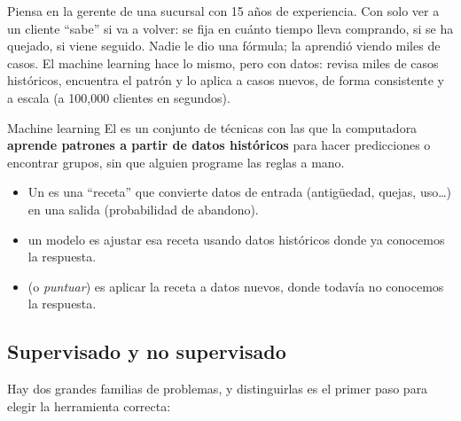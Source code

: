 Piensa en la gerente de una sucursal con 15 años de experiencia. Con solo ver a
un cliente ``sabe'' si va a volver: se fija en cuánto tiempo lleva comprando, si
se ha quejado, si viene seguido. Nadie le dio una fórmula; la aprendió viendo
miles de casos. El machine learning hace lo mismo, pero con datos: revisa miles
de casos históricos, encuentra el patrón y lo aplica a casos nuevos, de forma
consistente y a escala (a 100{,}000 clientes en segundos).

\begin{concepto}{Machine learning}
El  es un conjunto de técnicas con las que la
computadora \textbf{aprende patrones a partir de datos históricos} para hacer
predicciones o encontrar grupos, sin que alguien programe las reglas a mano.
\begin{itemize}
  \item Un  es una ``receta'' que convierte datos de entrada
        (antigüedad, quejas, uso\ldots) en una salida (probabilidad de
        abandono).
  \item {} un modelo es ajustar esa receta usando datos
        históricos donde ya conocemos la respuesta.
  \item {} (o \emph{puntuar}) es aplicar la receta a datos
        nuevos, donde todavía no conocemos la respuesta.
\end{itemize}
\end{concepto}

\subsection{Supervisado y no supervisado}

Hay dos grandes familias de problemas, y distinguirlas es el primer paso para
elegir la herramienta correcta:

